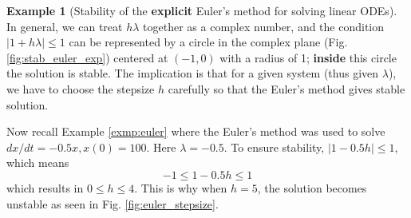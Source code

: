 \documentclass[a4paper,11pt]{article}
\theoremstyle{definition}
\newtheorem{exmp}{Example}[section]
\begin{document}
\begin{exmp}[Stability of the \textbf{explicit} Euler's method for solving linear ODEs]
In general, we can treat $h \lambda$ together as a complex number, and the condition
$| 1 + h \lambda | \leq 1$ can be represented by a circle in the complex plane (Fig. \ref{fig:stab_euler_exp})
centered at $(-1, 0)$ with a radius of 1; \textbf{inside} this circle the solution is stable.
The implication is that for a given system (thus given $\lambda$), we have to choose the stepsize $h$ carefully
so that the Euler's method gives stable solution.

Now recall Example \ref{exmp:euler} where the Euler's method was used to solve $dx/dt=-0.5 x, x(0) = 100$.
Here $\lambda = -0.5$. To ensure stability, $| 1 - 0.5 h | \leq 1$, which means
\[  -1 \leq 1 - 0.5 h \leq 1 \]
\noindent which results in $ 0 \leq h \leq 4$. This is why when $h = 5$, the solution becomes unstable
as seen in Fig. \ref{fig:euler_stepsize}.

\end{exmp}
\end{document}
